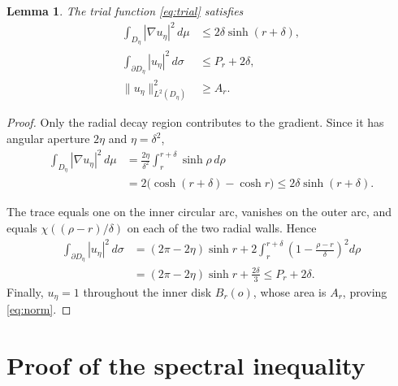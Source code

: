 \documentclass[11pt]{article}
\newtheorem{lemma}[theorem]{Lemma}
\theoremstyle{remark}
\begin{document}
\begin{lemma}\label{lem:estimates}
The trial function \eqref{eq:trial} satisfies
\begin{align}
 \int_{D_\eta}|\nabla u_\eta|^2\,d\mu
 &\le2\delta\sinh(r+\delta),\label{eq:energy}\\
 \int_{\partial D_\eta}|u_\eta|^2\,d\sigma
 &\le P_r+2\delta,\label{eq:trace}\\
 \|u_\eta\|_{L^2(D_\eta)}^2&\ge A_r.\label{eq:norm}
\end{align}
\end{lemma}

\begin{proof}
Only the radial decay region contributes to the gradient.  Since it has
angular aperture $2\eta$ and $\eta=\delta^2$,
\begin{align*}
 \int_{D_\eta}|\nabla u_\eta|^2\,d\mu
 &=\frac{2\eta}{\delta^2}
   \int_r^{r+\delta}\sinh\rho\,d\rho\\
 &=2\bigl(\cosh(r+\delta)-\cosh r\bigr)
 \le2\delta\sinh(r+\delta).
\end{align*}

The trace equals one on the inner circular arc, vanishes on the outer arc,
and equals $\chi((\rho-r)/\delta)$ on each of the two radial walls.  Hence
\begin{align*}
 \int_{\partial D_\eta}|u_\eta|^2\,d\sigma
 &=(2\pi-2\eta)\sinh r
 +2\int_r^{r+\delta}
 \left(1-\frac{\rho-r}{\delta}\right)^2d\rho\\
 &=(2\pi-2\eta)\sinh r+\frac{2\delta}{3}
 \le P_r+2\delta.
\end{align*}
Finally, $u_\eta=1$ throughout the inner disk $B_r(o)$, whose area is
$A_r$, proving \eqref{eq:norm}.
\end{proof}

\section{Proof of the spectral inequality}
\end{document}
